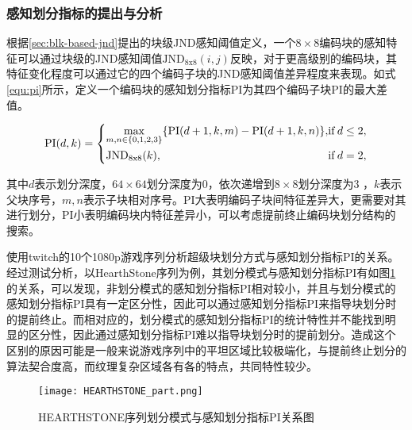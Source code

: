 	\subsubsection{感知划分指标的提出与分析}

  根据\ref{sec:blk-based-jnd}提出的块级JND感知阈值定义，一个$8\times 8$编码块的感知特征可以通过块级的JND感知阈值$\mathrm{JND_{8x8}}(i, j)$反映，对于更高级别的编码块，其特征变化程度可以通过它的四个编码子块的JND感知阈值差异程度来表现。如式\ref{equ:pi}所示，定义一个编码块的感知划分指标PI为其四个编码子块PI的最大差值。

  \begin{equation} \label{equ:pi}
    \mathrm{PI}(d, k) =
    \begin{dcases}
      \max_{m,n\in \{0, 1, 2, 3\}} \{\mathrm{PI}(d+1, k, m) - \mathrm{PI}(d+1,k, n) \} , &\mathrm{if} \, d \leq 2,\\
      \quad \mathrm{JND_{8x8}}(k), &\mathrm{if}\, d = 2,
    \end{dcases}
  \end{equation}

  其中$d$表示划分深度，$64\times 64$划分深度为0，依次递增到$8\times 8$划分深度为3 ，$k$表示父块序号，$m, n$表示子块相对序号。PI大表明编码子块间特征差异大，更需要对其进行划分，PI小表明编码块内特征差异小，可以考虑提前终止编码块划分结构的搜索。


 使用twitch的10个1080p游戏序列分析超级块划分方式与感知划分指标PI的关系。经过测试分析，以HearthStone序列为例，其划分模式与感知划分指标PI有如图\ref{fig:jnd-part-PI-example}的关系，可以发现，非划分模式的感知划分指标PI相对较小，并且与划分模式的感知划分指标PI具有一定区分性，因此可以通过感知划分指标PI来指导块划分时的提前终止。而相对应的，划分模式的感知划分指标PI的统计特性并不能找到明显的区分性，因此通过感知划分指标PI难以指导块划分时的提前划分。造成这个区别的原因可能是一般来说游戏序列中的平坦区域比较极端化，与提前终止划分的算法契合度高，而纹理复杂区域各有各的特点，共同特性较少。

  \begin{figure}[!htp]
    \centering
    \texttt{[image: HEARTHSTONE\_part.png]}
    \caption{HEARTHSTONE序列划分模式与感知划分指标PI关系图}
   \label{fig:jnd-part-PI-example}
  \end{figure}

